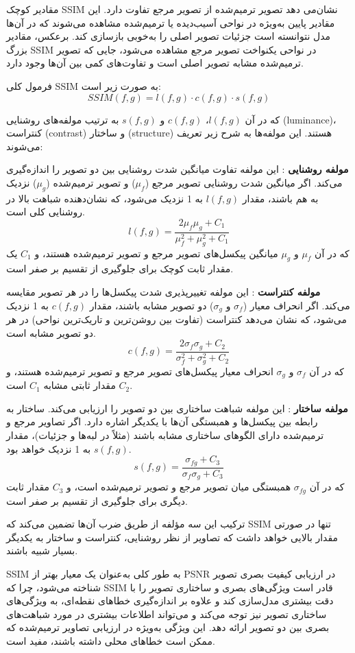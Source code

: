 مقادیر کوچک SSIM نشان‌می دهد تصویر ترمیم‌شده از تصویر مرجع تفاوت دارد. این مقادیر پایین به‌ویژه در نواحی آسیب‌دیده یا ترمیم‌شده مشاهده می‌شوند که در آن‌ها مدل نتوانسته است جزئیات تصویر اصلی را به‌خوبی بازسازی کند. برعکس، مقادیر بزرگ SSIM در نواحی یکنواخت تصویر مرجع مشاهده می‌شود، جایی که تصویر ترمیم‌شده مشابه تصویر اصلی است و تفاوت‌های کمی بین آن‌ها وجود دارد.

فرمول کلی SSIM به صورت زیر است:
$$
SSIM(f, g) = l(f, g) \cdot c(f, g) \cdot s(f, g)
$$

که در آن $l(f, g)$، $c(f, g)$ و $s(f, g)$ به ترتیب مولفه‌های روشنایی (luminance)، کنتراست (contrast) و ساختار (structure) هستند. این مولفه‌ها به شرح زیر تعریف می‌شوند:

\textbf{مولفه روشنایی}%
: این مولفه تفاوت میانگین شدت روشنایی بین دو تصویر را اندازه‌گیری می‌کند. اگر میانگین شدت روشنایی تصویر مرجع ($\mu_f$) و تصویر ترمیم‌شده ($\mu_g$) نزدیک به هم باشند، مقدار $l(f, g)$ به 1 نزدیک می‌شود، که نشان‌دهنده شباهت بالا در روشنایی کلی است.
$$
l(f, g) = \frac{2\mu_f \mu_g + C_1}{\mu_f^2 + \mu_g^2 + C_1}
$$
که در آن $\mu_f$ و $\mu_g$ میانگین پیکسل‌های تصویر مرجع و تصویر ترمیم‌شده هستند، و $C_1$ یک مقدار ثابت کوچک برای جلوگیری از تقسیم بر صفر است.

\textbf{مولفه کنتراست}%
:    این مولفه تغییرپذیری شدت پیکسل‌ها را در هر تصویر مقایسه می‌کند. اگر انحراف معیار ($\sigma_f$ و $\sigma_g$) دو تصویر مشابه باشند، مقدار $c(f, g)$ به 1 نزدیک می‌شود، که نشان می‌دهد کنتراست (تفاوت بین روشن‌ترین و تاریک‌ترین نواحی) در هر دو تصویر مشابه است.
$$
c(f, g) = \frac{2\sigma_f \sigma_g + C_2}{\sigma_f^2 + \sigma_g^2 + C_2}
$$
که در آن $\sigma_f$ و $\sigma_g$ انحراف معیار پیکسل‌های تصویر مرجع و تصویر ترمیم‌شده هستند، و $C_2$ مقدار ثابتی مشابه $C_1$ است.

\textbf{مولفه ساختار}
: این مولفه شباهت ساختاری بین دو تصویر را ارزیابی می‌کند. ساختار به رابطه بین پیکسل‌ها و همبستگی آن‌ها با یکدیگر اشاره دارد. اگر تصاویر مرجع و ترمیم‌شده دارای الگوهای ساختاری مشابه باشند (مثلاً در لبه‌ها و جزئیات)، مقدار $s(f, g)$ به 1 نزدیک خواهد بود.
$$
s(f, g) = \frac{\sigma_{fg} + C_3}{\sigma_f \sigma_g + C_3}
$$
که در آن $\sigma_{fg}$ همبستگی میان تصویر مرجع و تصویر ترمیم‌شده است، و $C_3$ مقدار ثابت دیگری برای جلوگیری از تقسیم بر صفر است.

ترکیب این سه مؤلفه از طریق ضرب آن‌ها تضمین می‌کند که SSIM تنها در صورتی مقدار بالایی خواهد داشت که تصاویر از نظر روشنایی، کنتراست و ساختار به یکدیگر بسیار شبیه باشند.

SSIM
به طور کلی به‌عنوان یک معیار بهتر از PSNR در ارزیابی کیفیت بصری تصویر شناخته می‌شود، چرا که SSIM قادر است ویژگی‌های بصری و ساختاری تصویر را با دقت بیشتری مدل‌سازی کند و علاوه بر اندازه‌گیری خطاهای نقطه‌ای، به ویژگی‌های ساختاری تصویر نیز توجه می‌کند و می‌تواند اطلاعات بیشتری در مورد شباهت‌های بصری بین دو تصویر ارائه دهد. این ویژگی به‌ویژه در ارزیابی تصاویر ترمیم‌شده که ممکن است خطاهای محلی داشته باشند، مفید است.




